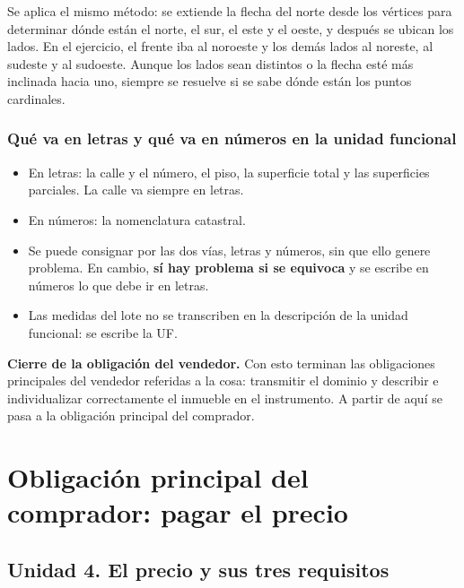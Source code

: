 \documentclass[12pt,oneside,a4paper]{book}
\begin{document}
Se aplica el mismo método: se extiende la flecha del norte desde los vértices para determinar dónde están el norte, el sur, el este y el oeste, y después se ubican los lados. En el ejercicio, el frente iba al noroeste y los demás lados al noreste, al sudeste y al sudoeste. Aunque los lados sean distintos o la flecha esté más inclinada hacia uno, siempre se resuelve si se sabe dónde están los puntos cardinales.

\subsection{Qué va en letras y qué va en números en la unidad funcional}

\begin{itemize}
    \item En letras: la calle y el número, el piso, la superficie total y las superficies parciales. La calle va siempre en letras.
    \item En números: la nomenclatura catastral.
    \item Se puede consignar por las dos vías, letras y números, sin que ello genere problema. En cambio, \textbf{sí hay problema si se equivoca} y se escribe en números lo que debe ir en letras.
    \item Las medidas del lote no se transcriben en la descripción de la unidad funcional: se escribe la UF.
\end{itemize}

\begin{important}
\textbf{Cierre de la obligación del vendedor.} Con esto terminan las obligaciones principales del vendedor referidas a la cosa: transmitir el dominio y describir e individualizar correctamente el inmueble en el instrumento. A partir de aquí se pasa a la obligación principal del comprador.
\end{important}

\chapter{Obligación principal del comprador: pagar el precio}

\section{Unidad 4. El precio y sus tres requisitos}
\end{document}
